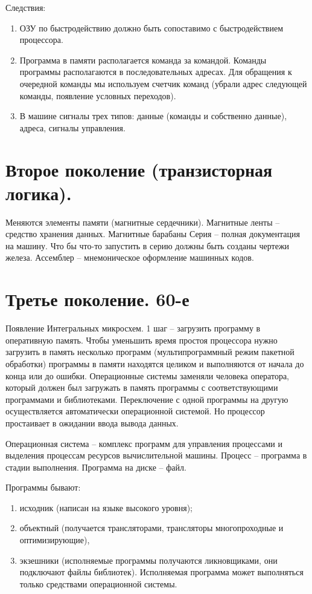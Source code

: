 Следствия:
\begin{enumerate}
    \item ОЗУ по быстродействию должно быть сопоставимо с быстродействием процессора.
    \item Программа в памяти располагается команда за командой. Команды программы располагаются в последовательных адресах. Для обращения к очередной команды мы используем счетчик команд (убрали адрес следующей команды, появление условных переходов).
    \item В машине сигналы трех типов: данные (команды и собственно данные), адреса, сигналы управления.
\end{enumerate}

\section{Второе поколение (транзисторная логика).}

Меняются элементы памяти (магнитные сердечники). Магнитные ленты – средство хранения данных. Магнитные барабаны
Серия – полная документация на машину. Что бы что-то запустить в серию должны быть созданы чертежи железа.
Ассемблер – мнемоническое оформление машинных кодов. 

\section{Третье поколение. 60-е}

Появление Интегральных микросхем. 
1 шаг – загрузить программу в оперативную память. 
Чтобы уменьшить время простоя процессора нужно загрузить в память несколько программ (мультипрограммный режим пакетной обработки) программы в памяти находятся целиком и выполняются от начала до конца или до ошибки. Операционные системы заменяли человека оператора, который должен был загружать в память программы с соответствующими программами и библиотеками. Переключение с одной программы на другую осуществляется автоматически операционной системой. Но процессор простаивает в ожидании ввода вывода данных.

Операционная система – комплекс программ для управления процессами и выделения процессам ресурсов вычислительной машины.
Процесс – программа в стадии выполнения. Программа на диске – файл.

Программы бывают: 
\begin{enumerate}
    \item исходник (написан на языке высокого уровня);
    \item объектный (получается трансляторами, трансляторы многопроходные и оптимизирующие), 
    \item экзешники (исполняемые программы получаются ликновщиками, они подключают файлы библиотек). Исполняемая программа может выполняться только средствами операционной системы.
\end{enumerate}

